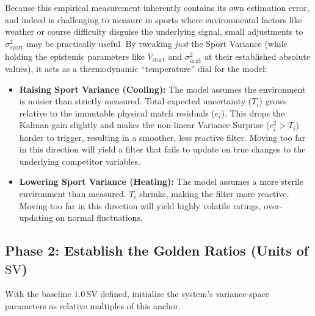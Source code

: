 \documentclass[12pt]{article}
\begin{document}
	Because this empirical measurement inherently contains its own estimation error, and indeed is challenging to measure in sports where environmental factors like weather or course difficulty disguise the underlying signal, small adjustments to $\sigma_{\mathrm{sport}}^2$ may be practically useful. By tweaking \emph{just} the Sport Variance (while holding the epistemic parameters like $V_{\mathrm{start}}$ and $\sigma_{\mathrm{drift}}^2$ at their established absolute values), it acts as a thermodynamic ``temperature'' dial for the model:
	\begin{itemize}
		\item \textbf{Raising Sport Variance (Cooling):} The model assumes the environment is noisier than strictly measured. Total expected uncertainty ($T_i$) grows relative to the immutable physical match residuals ($e_i$). This drops the Kalman gain slightly and makes the non-linear Variance Surprise ($e_i^2 > T_i$) harder to trigger, resulting in a smoother, less reactive filter. Moving too far in this direction will yield a filter that fails to update on true changes to the underlying competitor variables.
		\item \textbf{Lowering Sport Variance (Heating):} The model assumes a more sterile environment than measured. $T_i$ shrinks, making the filter more reactive. Moving too far in this direction will yield highly volatile ratings, over-updating on normal fluctuations.
	\end{itemize}

	\subsection{Phase 2: Establish the Golden Ratios (Units of $\mathrm{SV}$)}
	With the baseline $1.0\,\mathrm{SV}$ defined, initialize the system's variance-space parameters as relative multiples of this anchor.
\end{document}
